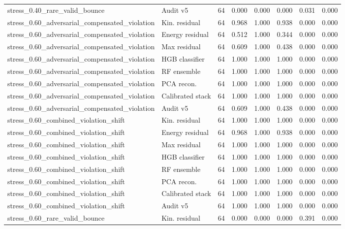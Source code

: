 {\begin{longtable}{llrrrrrr}
stress\_0.40\_rare\_valid\_bounce & Audit v5 & 64 & 0.000 & 0.000 & 0.000 & 0.031 & 0.000 \\
stress\_0.60\_adversarial\_compensated\_violation & Kin. residual & 64 & 0.968 & 1.000 & 0.938 & 0.000 & 0.000 \\
stress\_0.60\_adversarial\_compensated\_violation & Energy residual & 64 & 0.512 & 1.000 & 0.344 & 0.000 & 0.000 \\
stress\_0.60\_adversarial\_compensated\_violation & Max residual & 64 & 0.609 & 1.000 & 0.438 & 0.000 & 0.000 \\
stress\_0.60\_adversarial\_compensated\_violation & HGB classifier & 64 & 1.000 & 1.000 & 1.000 & 0.000 & 0.000 \\
stress\_0.60\_adversarial\_compensated\_violation & RF ensemble & 64 & 1.000 & 1.000 & 1.000 & 0.000 & 0.000 \\
stress\_0.60\_adversarial\_compensated\_violation & PCA recon. & 64 & 1.000 & 1.000 & 1.000 & 0.000 & 0.000 \\
stress\_0.60\_adversarial\_compensated\_violation & Calibrated stack & 64 & 1.000 & 1.000 & 1.000 & 0.000 & 0.000 \\
stress\_0.60\_adversarial\_compensated\_violation & Audit v5 & 64 & 0.609 & 1.000 & 0.438 & 0.000 & 0.000 \\
stress\_0.60\_combined\_violation\_shift & Kin. residual & 64 & 1.000 & 1.000 & 1.000 & 0.000 & 0.000 \\
stress\_0.60\_combined\_violation\_shift & Energy residual & 64 & 0.968 & 1.000 & 0.938 & 0.000 & 0.000 \\
stress\_0.60\_combined\_violation\_shift & Max residual & 64 & 1.000 & 1.000 & 1.000 & 0.000 & 0.000 \\
stress\_0.60\_combined\_violation\_shift & HGB classifier & 64 & 1.000 & 1.000 & 1.000 & 0.000 & 0.000 \\
stress\_0.60\_combined\_violation\_shift & RF ensemble & 64 & 1.000 & 1.000 & 1.000 & 0.000 & 0.000 \\
stress\_0.60\_combined\_violation\_shift & PCA recon. & 64 & 1.000 & 1.000 & 1.000 & 0.000 & 0.000 \\
stress\_0.60\_combined\_violation\_shift & Calibrated stack & 64 & 1.000 & 1.000 & 1.000 & 0.000 & 0.000 \\
stress\_0.60\_combined\_violation\_shift & Audit v5 & 64 & 1.000 & 1.000 & 1.000 & 0.000 & 0.000 \\
stress\_0.60\_rare\_valid\_bounce & Kin. residual & 64 & 0.000 & 0.000 & 0.000 & 0.391 & 0.000 \\

\end{longtable}}
